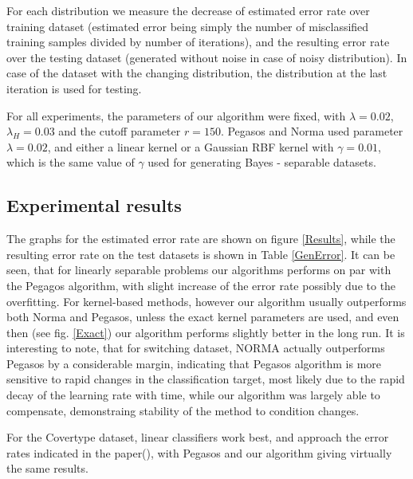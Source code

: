 \documentclass[10pt,twocolumn, a4paper]{article}
\begin{document}
For each distribution we measure the decrease of estimated error rate over training dataset (estimated error being simply the number of misclassified training samples divided by number of iterations), and the resulting error rate over the testing dataset (generated without noise in case of noisy distribution). In case of the dataset with the changing distribution, the distribution at the last iteration is used for testing.

For all experiments, the parameters of our algorithm were fixed, with $\lambda=0.02$, $\lambda_H=0.03$ and the cutoff parameter $r=150$. Pegasos and Norma used parameter $\lambda=0.02$, and either a linear kernel or a Gaussian RBF kernel with $\gamma=0.01$, which is the same value of $\gamma$ used for generating Bayes - separable datasets.
\subsection{Experimental results}
The graphs for the estimated error rate are shown on figure \ref{Results}, while the resulting error rate on the test datasets is shown in Table \ref{GenError}.
It can be  seen, that for linearly separable problems our algorithms performs on par with the Pegagos algorithm, with slight increase of the error rate possibly due to the overfitting. For kernel-based methods, however our algorithm usually outperforms both Norma and Pegasos, unless the exact kernel parameters are used, and even then (see fig. \ref{Exact}) our algorithm performs slightly better in the long run. It is interesting to note, that for switching dataset, NORMA actually outperforms Pegasos by a considerable margin, indicating that Pegasos algorithm is more sensitive to rapid changes in the classification target, most likely due to the rapid decay of the learning rate with time, while our algorithm was largely able to compensate, demonstraing stability of the method to condition changes. 

For the Covertype dataset, linear classifiers work best, and approach the error rates indicated in the paper(\cite{Forest}), with Pegasos and our algorithm giving virtually the same results. 
\end{document}
